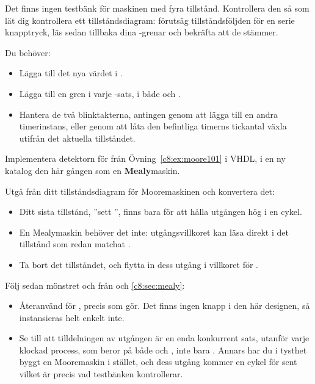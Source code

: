 Det finns ingen testbänk för maskinen med fyra tillstånd. Kontrollera den så som
 lät dig kontrollera ett tillståndsdiagram: förutsäg tillståndsföljden för en
serie knapptryck, läs sedan tillbaka dina -grenar och bekräfta att de stämmer.

Du behöver:
\begin{itemize}
  \item Lägga till det nya värdet i .
  \item Lägga till en gren i varje -sats, i både  och
    .
  \item Hantera de två blinktakterna, antingen genom att lägga till en andra timerinstans, eller
    genom att låta den befintliga timerns tickantal växla utifrån det aktuella tillståndet.
\end{itemize}

\label{c8:ex:mealy101}
Implementera detektorn för  från Övning~\ref{c8:ex:moore101} i VHDL, i en ny katalog
 \textemdash{} den här gången som en \textbf{Mealy}maskin.

Utgå från ditt tillståndsdiagram för Mooremaskinen och konvertera det:
\begin{itemize}
  \item Ditt sista tillstånd, ”sett ”, finns bara för att hålla utgången hög i en cykel.
  \item En Mealymaskin behöver det inte: utgångsvillkoret kan läsa  direkt i det tillstånd
    som redan matchat .
  \item Ta bort det tillståndet, och flytta in dess utgång i villkoret för .
\end{itemize}

Följ sedan mönstret  och  från  och
\ref{c8:sec:mealy}:
\begin{itemize}
  \item Återanvänd  för , precis som  gör.
    Det finns ingen knapp i den här designen, så  instansieras helt enkelt inte.
  \item Se till att tilldelningen av utgången  är en enda konkurrent sats, utanför varje
    klockad process, som beror på både  och , inte bara . Annars
    har du i tysthet byggt en Mooremaskin i stället, och dess utgång kommer en cykel för sent
    \textemdash{} vilket är precis vad testbänken kontrollerar.
\end{itemize}


